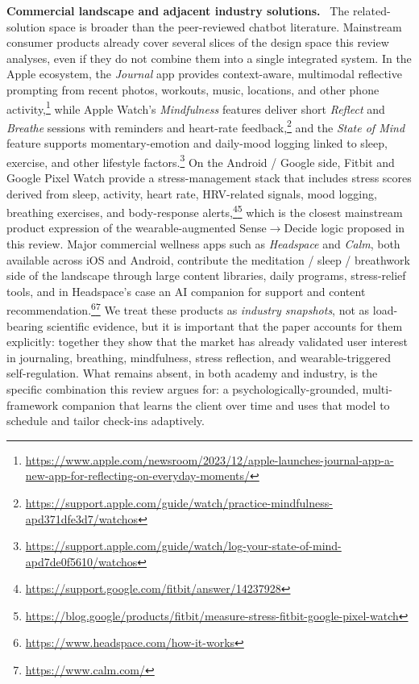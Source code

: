 \documentclass[10pt,conference]{article}
\renewcommand{\paragraph}[1]{\smallskip\par\noindent\textbf{#1}~\ignorespaces}
\begin{document}
\paragraph{Commercial landscape and adjacent industry solutions.}
The related-solution space is broader than the peer-reviewed chatbot
literature. Mainstream consumer products already cover several slices
of the design space this review analyses, even if they do not combine
them into a single integrated system. In the Apple ecosystem, the
\emph{Journal} app provides context-aware, multimodal reflective
prompting from recent photos, workouts, music, locations, and other
phone activity,\footnote{\url{https://www.apple.com/newsroom/2023/12/apple-launches-journal-app-a-new-app-for-reflecting-on-everyday-moments/}}
while Apple Watch's \emph{Mindfulness} features deliver short
\emph{Reflect} and \emph{Breathe} sessions with reminders and heart-rate
feedback,\footnote{\url{https://support.apple.com/guide/watch/practice-mindfulness-apd371dfe3d7/watchos}}
and the \emph{State of Mind} feature supports momentary-emotion and
daily-mood logging linked to sleep, exercise, and other lifestyle
factors.\footnote{\url{https://support.apple.com/guide/watch/log-your-state-of-mind-apd7de0f5610/watchos}}
On the Android / Google side, Fitbit and Google Pixel Watch provide a
stress-management stack that includes stress scores derived from sleep,
activity, heart rate, HRV-related signals, mood logging, breathing
exercises, and body-response alerts,\footnote{\url{https://support.google.com/fitbit/answer/14237928}}\footnote{\url{https://blog.google/products/fitbit/measure-stress-fitbit-google-pixel-watch}}
which is the closest mainstream product expression of the
wearable-augmented Sense$\to$Decide logic proposed in this review.
Major commercial wellness apps such as \emph{Headspace} and
\emph{Calm}, both available across iOS and Android, contribute the
meditation / sleep / breathwork side of the landscape through large
content libraries, daily programs, stress-relief tools, and in
Headspace's case an AI companion for support and content
recommendation.\footnote{\url{https://www.headspace.com/how-it-works}}\footnote{\url{https://www.calm.com/}}
We treat these products as \emph{industry snapshots}, not as
load-bearing scientific evidence, but it is important that the paper
accounts for them explicitly: together they show that the market has
already validated user interest in journaling, breathing,
mindfulness, stress reflection, and wearable-triggered self-regulation.
What remains absent, in both academy and industry, is the specific
combination this review argues for: a psychologically-grounded,
multi-framework companion that learns the client over time and uses
that model to schedule and tailor check-ins adaptively.
\end{document}
